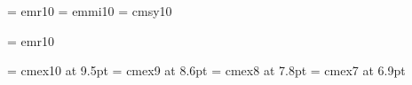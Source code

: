  \font\twtyrm  = emr10		%
 \font\twtymi  = emmi10		%
    \skewchar{}	%
 \font\twtysy  = cmsy10		%
    \skewchar{}	%

 \font\twfvrm  = emr10		%

 \font\tenex  = cmex10 at 9.5pt
 \font\ninex  = cmex9 at 8.6pt %
 \font\egtex  = cmex8 at 7.8pt %
 \font\sevex  = cmex7 at 6.9pt



\def\@mss{emss10}
\def\@mcsc{emcsc10}
\def\@mbi{emmib10}
\def\@mbsy{cmbsy10}
 
